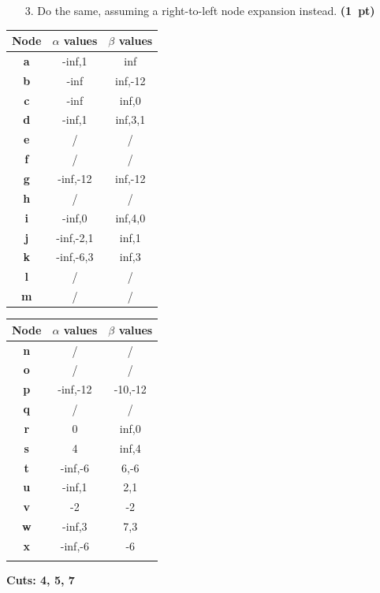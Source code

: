 \documentclass[11pt,a4paper]{report}
\begin{document}
\begin{enumerate}
\item[3.] Do the same, assuming a right-to-left node expansion instead.  \textbf{(1~pt)}
\end{enumerate}

\begin{answers}[8cm]
      \begin{multicols}{2}
      \begin{tabular}{ccc}
      Node & $\alpha$ values & $\beta$ values\\
      \hline
      \textbf{a} &-inf,1 &inf \\ %
      \textbf{b} &-inf  &inf,-12  \\
      \textbf{c} &-inf  &inf,0  \\
      \textbf{d} &-inf,1  &inf,3,1  \\
      \textbf{e} &/  &/  \\
      \textbf{f} &/  &/  \\
      \textbf{g} &-inf,-12  &inf,-12  \\
      \textbf{h} &/  &/  \\
      \textbf{i} &-inf,0  &inf,4,0  \\
      \textbf{j} &-inf,-2,1  &inf,1  \\
      \textbf{k} &-inf,-6,3  &inf,3  \\
      \textbf{l} &/  &/  \\
      \textbf{m} &/  &/  \\ 
      \end{tabular}
      
      \begin{tabular}{ccc}
      Node & $\alpha$ values & $\beta$ values\\
      \hline
      \textbf{n} &/  &/  \\
      \textbf{o} &/  &/  \\
      \textbf{p} &-inf,-12  &-10,-12  \\
      \textbf{q} &/  &/  \\
      \textbf{r} &0  &inf,0  \\
      \textbf{s} &4  &inf,4  \\
      \textbf{t} &-inf,-6  &6,-6  \\
      \textbf{u} &-inf,1  &2,1  \\
      \textbf{v} &-2  &-2  \\
      \textbf{w} &-inf,3  &7,3  \\
      \textbf{x} &-inf,-6  &-6  \\
       &  &  \\
      \end{tabular}
      \end{multicols}
      
\textbf{Cuts: 4, 5, 7} %
\end{answers}
\end{document}
